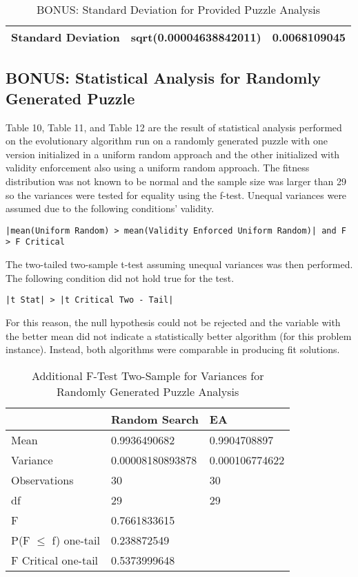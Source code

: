 \documentclass[11pt]{article}
\begin{document}
\begin{table}[H]
\centering
\caption{BONUS: Standard Deviation for Provided Puzzle Analysis}
\label{my-label}
\begin{tabular}{|l|l|l|}
\hline
Standard Deviation & sqrt(0.00004638842011) & 0.0068109045 \\ \hline
\end{tabular}
\end{table}




\subsection{BONUS: Statistical Analysis for Randomly Generated Puzzle}

Table 10, Table 11, and Table 12 are the result of statistical analysis performed on 
the evolutionary algorithm run on a randomly generated puzzle with one version 
initialized in a uniform random approach and the other initialized with validity 
enforcement also using a uniform random approach. The fitness distribution was not 
known to be normal and the sample size was larger than 29 so the variances were 
tested for equality using the f-test. Unequal variances were assumed due to the 
following conditions' validity.

\begin{center}
\texttt{|mean(Uniform Random) > mean(Validity Enforced Uniform Random)| and F > F Critical}
\end{center}

The two-tailed two-sample t-test assuming unequal variances was then performed. The following condition did not hold true for the test.

\begin{center}
\texttt{|t Stat| > |t Critical Two - Tail|}
\end{center}

For this reason, the null hypothesis could not be rejected and the variable with the better mean did not indicate a statistically better algorithm (for this problem instance). Instead, both algorithms were comparable in producing fit solutions.





\begin{table}[]
\centering
\caption{Additional F-Test Two-Sample for Variances for Randomly Generated Puzzle Analysis}
\label{my-label}
\begin{tabular}{l|l|l}
 & Random Search & EA \\ \hline
Mean & 0.9936490682 & 0.9904708897 \\
Variance & 0.00008180893878 & 0.000106774622 \\
Observations & 30 & 30 \\
df & 29 & 29 \\
F & 0.7661833615 &  \\
P(F $\leq$ f) one-tail & 0.238872549 &  \\
F Critical one-tail & 0.5373999648 & 
\end{tabular}
\end{table}
\end{document}
